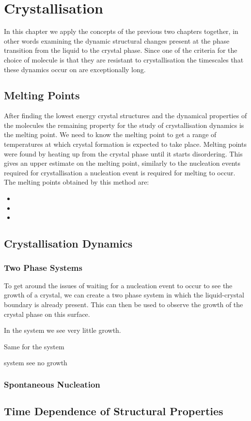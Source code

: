 \chapter{Crystallisation}

In this chapter we apply the concepts of the previous two chapters together, in other words examining the dynamic structural changes present at the phase transition from the liquid to the crystal phase. Since one of the criteria for the choice of molecule is that they are resistant to crystallisation the timescales that these dynamics occur on are exceptionally long.

\section{Melting Points}

After finding the lowest energy crystal structures and the dynamical properties of the molecules the remaining property for the study of crystallisation dynamics is the melting point. We need to know the melting point to get a range of temperatures at which crystal formation is expected to take place. Melting points were found by heating up from the crystal phase until it starts disordering. This gives an upper estimate on the melting point, similarly to the nucleation events required for crystallisation a nucleation event is required for melting to occur. The melting points obtained by this method are:
\begin{itemize}
    \item {}
    \item {}
    \item {}
\end{itemize}

\section{Crystallisation Dynamics}

\subsection{Two Phase Systems}

To get around the issues of waiting for a nucleation event to occur to see the growth of a crystal, we can create a two phase system in which the liquid-crystal boundary is already present. This can then be used to observe the growth of the crystal phase on this surface. 

In the \sone system we see very little growth.

Same for the \scon system

\tri system see no growth

\subsection{Spontaneous Nucleation}



\section{Time Dependence of Structural Properties}


